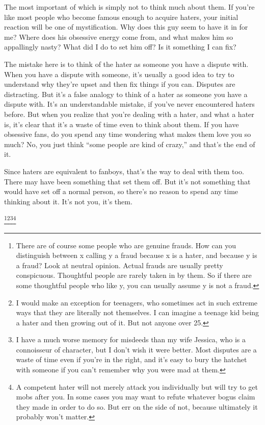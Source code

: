 \documentclass[12pt]{book}
\begin{document}
The most important of which is simply not to think much about them. If
you're like most people who become famous enough to acquire haters, your
initial reaction will be one of mystification. Why does this guy seem to
have it in for me? Where does his obsessive energy come from, and what
makes him so appallingly nasty? What did I do to set him off? Is it
something I can fix?

The mistake here is to think of the hater as someone you have a dispute
with. When you have a dispute with someone, it's usually a good idea to
try to understand why they're upset and then fix things if you can.
Disputes are distracting. But it's a false analogy to think of a hater
as someone you have a dispute with. It's an understandable mistake, if
you've never encountered haters before. But when you realize that you're
dealing with a hater, and what a hater is, it's clear that it's a waste
of time even to think about them. If you have obsessive fans, do you
spend any time wondering what makes them love you so much? No, you just
think ``some people are kind of crazy,'' and that's the end of it.

Since haters are equivalent to fanboys, that's the way to deal with them
too. There may have been something that set them off. But it's not
something that would have set off a normal person, so there's no reason
to spend any time thinking about it. It's not you, it's them.


\footnote{There are of course some people who are genuine frauds. How can
you distinguish between x calling y a fraud because x is a hater, and
because y is a fraud? Look at neutral opinion. Actual frauds are usually
pretty conspicuous. Thoughtful people are rarely taken in by them. So if
there are some thoughtful people who like y, you can usually assume y is
not a fraud.}\footnote{I would make an exception for teenagers, who sometimes act in
such extreme ways that they are literally not themselves. I can imagine
a teenage kid being a hater and then growing out of it. But not anyone
over 25.}\footnote{I have a much worse memory for misdeeds than my wife Jessica,
who is a connoisseur of character, but I don't wish it were better. Most
disputes are a waste of time even if you're in the right, and it's easy
to bury the hatchet with someone if you can't remember why you were mad
at them.}\footnote{A competent hater will not merely attack you individually but
will try to get mobs after you. In some cases you may want to refute
whatever bogus claim they made in order to do so. But err on the side of
not, because ultimately it probably won't matter.}
\end{document}
